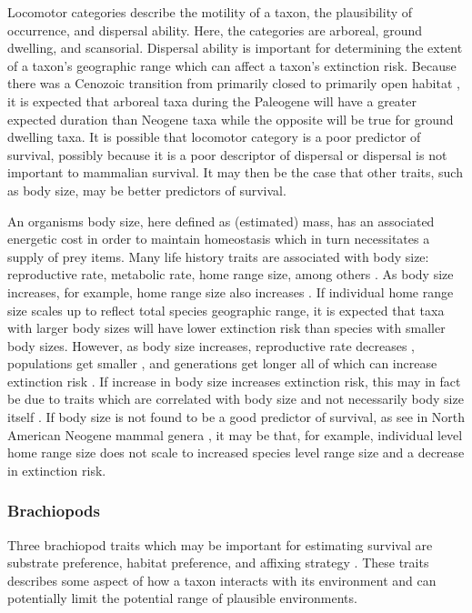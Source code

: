 \documentclass[12pt,letterpaper]{article}
\begin{document}
Locomotor categories describe the motility of a taxon, the plausibility of occurrence, and dispersal ability. Here, the categories are arboreal, ground dwelling, and scansorial. Dispersal ability is important for determining the extent of a taxon's geographic range \citep{Birand2012,Jablonski2006a,Gaston2009} which can affect a taxon's extinction risk. Because there was a Cenozoic transition from primarily closed to primarily open habitat \cite{Stromberg2005,Stromberg2013,Janis1993a,Blois2009,Rose2006}, it is expected that arboreal taxa during the Paleogene will have a greater expected duration than Neogene taxa while the opposite will be true for ground dwelling taxa. It is possible that locomotor category is a poor predictor of survival, possibly because it is a poor descriptor of dispersal or dispersal is not important to mammalian survival. It may then be the case that other traits, such as body size, may be better predictors of survival. 

An organisms body size, here defined as (estimated) mass, has an associated energetic cost in order to maintain homeostasis which in turn necessitates a supply of prey items. Many life history traits are associated with body size: reproductive rate, metabolic rate, home range size, among others \cite{Peters1983a,Damuth1979,Brown1987,Smith2004}. As body size increases, for example, home range size also increases \citep{Damuth1979}. If individual home range size scales up to reflect total species geographic range, it is expected that taxa with larger body sizes will have lower extinction risk than species with smaller body sizes. However, as body size increases, reproductive rate decreases \citep{Johnson2002b}, populations get smaller \citep{White2007}, and generations get longer \citep{Martin1993a} all of which can increase extinction risk \citep{Liow2008,Davidson2012}. If increase in body size increases extinction risk, this may in fact be due to traits which are correlated with body size and not necessarily body size itself \citep{Johnson2002b}. If body size is not found to be a good predictor of survival, as see in North American Neogene mammal genera \citep{Tomiya2013}, it may be that, for example, individual level home range size does not scale to increased species level range size and a decrease in extinction risk. 

\subsubsection{Brachiopods}
Three brachiopod traits which may be important for estimating survival are substrate preference, habitat preference, and affixing strategy \citep{Alexander1977,Richardson1997,Richardson1997a,Johansen1989}. These traits describes some aspect of how a taxon interacts with its environment and can potentially limit the potential range of plausible environments.
\end{document}
